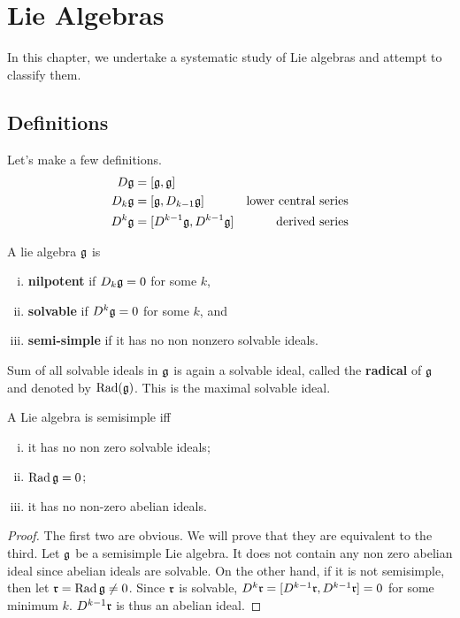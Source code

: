 \chapter{Lie Algebras}
\label{cha:lie_algebras}
In this chapter, we undertake a systematic study of Lie algebras and attempt to classify them.

\section{Definitions}

Let's make a few definitions.
\begin{align}
    D\mathfrak{g} &= [\mathfrak{g}, \mathfrak{g}] &\text{}\\
    D_k\mathfrak{g} &= [\mathfrak{g}, D_{k-1}\mathfrak{g}] &\text{lower central series}\\
    D^k\mathfrak{g} &= [D^{k-1}\mathfrak{g}, D^{k-1}\mathfrak{g}] &\text{derived series}
\end{align}

\begin{definition} A lie algebra $\mathfrak{g}$ is 
    \begin{enumerate}[(i)]
        \makethislistcompact
        \item \textbf{nilpotent} if $D_k\mathfrak{g}=0$ for some $k$,
        \item \textbf{solvable} if $D^k\mathfrak{g}=0$ for some $k$, and
        \item \textbf{semi-simple} if it has no non nonzero solvable ideals.
    \end{enumerate}
\end{definition}

\begin{definition}[Radical]
    Sum of all solvable ideals in $\mathfrak{g}$ is again a solvable ideal, called the \textbf{radical} of $\mathfrak{g}$ and denoted by $\operatorname{Rad}(\mathfrak{g})$. This is the maximal solvable ideal.
\end{definition}

\begin{lemma}
    \label{lemma:semisimple_definitions}
    A Lie algebra is semisimple iff 
    \begin{enumerate}[(i)]
        \makethislistcompact
        \item it has no non zero solvable ideals;
        \item $\operatorname{Rad} \mathfrak{g}=0$;
        \item it has no non-zero abelian ideals.
    \end{enumerate}
\end{lemma}
\begin{proof}
    The first two are obvious. We will prove that they are equivalent to the third.
    Let $\mathfrak{g}$ be a semisimple Lie algebra. It does not contain any non zero abelian ideal since abelian ideals are solvable. On the other hand, if it is not semisimple, then let $\Lie r = \Rad \Lie g \neq 0$. Since $\Lie r$ is solvable, $D^k\Lie r = [D^{k-1}\Lie r, D^{k-1}\Lie r]=0$ for some minimum $k$. $D^{k-1}\Lie r$ is thus an abelian ideal.

\end{proof}

